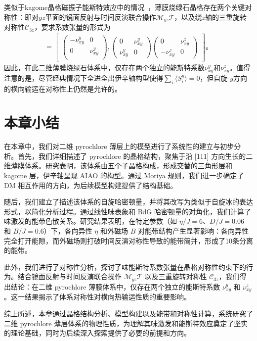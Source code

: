         类似于kagome晶格磁振子能斯特效应中的情况~\cite{li2020intrinsic}，薄膜烧绿石晶格存在两个关键对称性：即对$yz$平面的镜面反射与时间反演联合操作$\mathcal{M}_{yz} \mathcal{T}$，以及绕$z$轴的三重旋转对称性$\mathcal{C}_{3z}$，要求系数张量的形式为
        \begin{align}
        [\nu^x\!,\nu^y\!,\nu^z]=\begin{bmatrix}
            \begin{pmatrix}
            -\nu^y_{xy}     & 0\\
            0                  & \nu^y_{xy}\\
        \end{pmatrix}\!,\begin{pmatrix}
            0                  & \nu^y_{xy}\\
            \nu^{y}_{xy}    & 0
        \end{pmatrix}\!\begin{pmatrix}
            0                  & \nu^z_{xy}\\
            -\nu^z_{xy}     & 0
        \end{pmatrix}
        \end{bmatrix}。
        \end{align}
        因此，在此二维薄膜烧绿石体系中，仅存在两个独立的能斯特系数$\nu^y_{xy}$和$\nu^z_{xy}$。值得注意的是，尽管经典情况下全进全出伊辛轴构型使得$\sum_i\langle S_i^y \rangle=0$，但自旋-$y$方向的横向输运在对称性上仍然是允许的。
        
    \section{本章小结}

    在本章中，我们对二维 pyrochlore 薄层上的模型进行了系统性的建立与初步分析。首先，我们详细描述了 pyrochlore 的晶格结构，聚焦于沿 [111] 方向生长的二维薄膜体系。研究表明，该体系由五个子晶格构成，形成交替的三角形层和 kagome 层，伊辛轴呈现 AIAO 的构型。通过 Moriya 规则，我们进一步确定了 DM 相互作用的方向，为后续模型构建提供了结构基础。

    随后，我们建立了描述该体系的自旋哈密顿量，并将其改写为类似于自旋冰的表达形式，以简化分析过程。通过线性味表象和 BdG 哈密顿量的对角化，我们计算了味激发的能带色散关系。研究结果表明，在特定参数（如 $\eta/J = 6$、$D/J = 0.06$ 和 $B/J = 0.6$）下，各向异性 $\eta$ 和外磁场 $B$ 对能带结构产生显著影响：各向异性完全打开能隙，而外磁场则打破时间反演对称性导致的能带简并，形成了10条分离的能带。

    此外，我们进行了对称性分析，探讨了味能斯特系数张量在晶格对称性约束下的行为。结合镜面反射与时间反演联合操作 $\mathcal{M}_{yz} \mathcal{T}$ 以及三重旋转对称性 $\mathcal{C}_{3z}$，我们得出结论：在二维 pyrochlore 薄膜体系中，仅存在两个独立的能斯特系数 $\nu^y_{xy}$ 和 $\nu^z_{xy}$。这一结果揭示了体系对称性对横向热输运性质的重要影响。

    综上所述，本章通过晶格结构分析、模型构建以及能带和对称性计算，系统研究了二维 pyrochlore 薄层体系的物理性质，为理解其味激发和能斯特效应奠定了坚实的理论基础，同时为后续深入探索提供了必要的前提和方向。